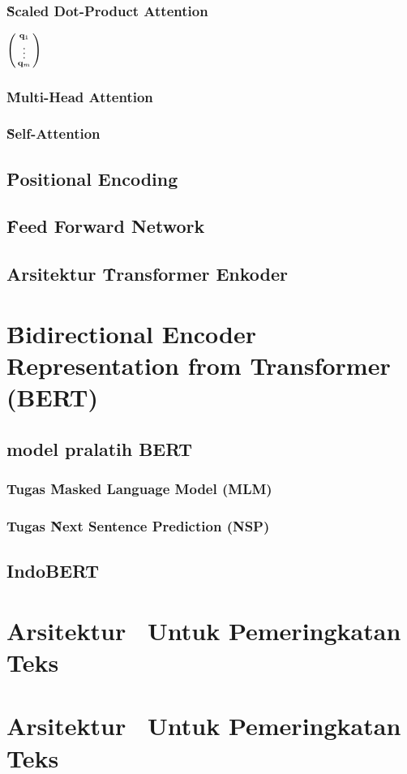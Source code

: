 \subsubsection{\f{Scaled Dot-Product Attention}}

$\begin{psmallmatrix}
	\mathbf{q}_1 \\
	\vdots \\
	\mathbf{q}_m
\end{psmallmatrix}
$

\subsubsection{\f{Multi-Head Attention}}

\subsubsection{\f{Self-Attention}}

\subsection{\f{Positional Encoding}}

\subsection{\f{Feed Forward Network}}


\subsection{Arsitektur \f{Transformer} Enkoder}

\section{\f{Bidirectional Encoder Representation from Transformer (BERT)}}

\subsection{model pralatih BERT}

\subsubsection{Tugas \f{Masked Language Model (MLM)}}

\subsubsection{Tugas \f{Next Sentence Prediction (NSP)}}

\subsection{IndoBERT}

\section{Arsitektur \bertcat~Untuk Pemeringkatan Teks}

\section{Arsitektur \bertdot~Untuk Pemeringkatan Teks}


